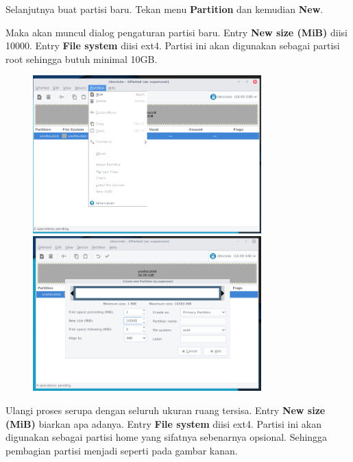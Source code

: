 \documentclass[12pt,]{article}
\begin{document}
	Selanjutnya buat partisi baru. Tekan menu \textbf{Partition} dan kemudian \textbf{New}.
	
	Maka akan muncul dialog pengaturan partisi baru.
	Entry \textbf{New size (MiB)} diisi 10000.
	Entry \textbf{File system}  diisi ext4.
	Partisi ini akan digunakan sebagai partisi root sehingga butuh minimal 10GB.
	
	\newpage
	\begin{figure}[!ht]
		\centering
		\includegraphics[width=250pt]{installhdd/step_8}
		\includegraphics[width=250pt]{installhdd/step_9}
	\end{figure}

	Ulangi proses serupa dengan seluruh ukuran ruang tersisa.
	Entry \textbf{New size (MiB)} biarkan apa adanya.
	Entry \textbf{File system}  diisi ext4.
	Partisi ini akan digunakan sebagai partisi home yang sifatnya sebenarnya opsional.
	Sehingga pembagian partisi menjadi seperti pada gambar kanan.
	
\end{document}
